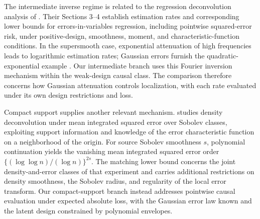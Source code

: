 \documentclass[11pt]{article}
\begin{document}
The intermediate inverse regime is related to the regression deconvolution analysis of \citet{FanTruong1993}. Their Sections 3--4 establish estimation rates and corresponding lower bounds for errors-in-variables regression, including pointwise squared-error risk, under positive-design, smoothness, moment, and characteristic-function conditions. In the supersmooth case, exponential attenuation of high frequencies leads to logarithmic estimation rates; Gaussian errors furnish the quadratic-exponential example \citep[Sections 3--4]{FanTruong1993}. Our intermediate branch uses this Fourier inversion mechanism within the weak-design causal class. The comparison therefore concerns how Gaussian attenuation controls localization, with each rate evaluated under its own design restrictions and loss.

Compact support supplies another relevant mechanism. \citet[Theorems 1--2]{Meister2007} studies density deconvolution under mean integrated squared error over Sobolev classes, exploiting support information and knowledge of the error characteristic function on a neighborhood of the origin. For source Sobolev smoothness \(s\), polynomial continuation yields the vanishing mean integrated squared error order \(\{(\log\log n)/(\log n)\}^{2s}\). The matching lower bound concerns the joint density-and-error classes of that experiment and carries additional restrictions on density smoothness, the Sobolev radius, and regularity of the local error transform. Our compact-support branch instead addresses pointwise causal evaluation under expected absolute loss, with the Gaussian error law known and the latent design constrained by polynomial envelopes.
\end{document}
